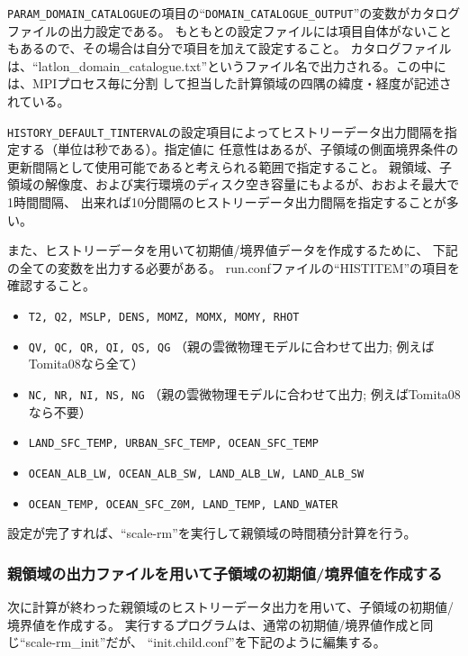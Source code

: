\verb|PARAM_DOMAIN_CATALOGUE|の項目の``\verb|DOMAIN_CATALOGUE_OUTPUT|''の変数がカタログファイルの出力設定である。
もともとの設定ファイルには項目自体がないこともあるので、その場合は自分で項目を加えて設定すること。
カタログファイルは、``latlon\_domain\_catalogue.txt''というファイル名で出力される。この中には、MPIプロセス毎に分割
して担当した計算領域の四隅の緯度・経度が記述されている。

\verb|HISTORY_DEFAULT_TINTERVAL|の設定項目によってヒストリーデータ出力間隔を指定する（単位は秒である）。指定値に
任意性はあるが、子領域の側面境界条件の更新間隔として使用可能であると考えられる範囲で指定すること。
親領域、子領域の解像度、および実行環境のディスク空き容量にもよるが、おおよそ最大で1時間間隔、
出来れば10分間隔のヒストリーデータ出力間隔を指定することが多い。

また、ヒストリーデータを用いて初期値/境界値データを作成するために、
下記の全ての変数を出力する必要がある。
run.confファイルの``HISTITEM''の項目を確認すること。

\begin{itemize}
 \item \verb|T2, Q2, MSLP, DENS, MOMZ, MOMX, MOMY, RHOT|
 \item \verb|QV, QC, QR, QI, QS, QG| {\small （親の雲微物理モデルに合わせて出力; 例えばTomita08なら全て）}
 \item \verb|NC, NR, NI, NS, NG| {\small （親の雲微物理モデルに合わせて出力; 例えばTomita08なら不要）}
 \item \verb|LAND_SFC_TEMP, URBAN_SFC_TEMP, OCEAN_SFC_TEMP|
 \item \verb|OCEAN_ALB_LW, OCEAN_ALB_SW, LAND_ALB_LW, LAND_ALB_SW|
 \item \verb|OCEAN_TEMP, OCEAN_SFC_Z0M, LAND_TEMP, LAND_WATER|
\end{itemize}

設定が完了すれば、``scale-rm''を実行して親領域の時間積分計算を行う。


\subsubsection{親領域の出力ファイルを用いて子領域の初期値/境界値を作成する}
次に計算が終わった親領域のヒストリーデータ出力を用いて、子領域の初期値/境界値を作成する。
実行するプログラムは、通常の初期値/境界値作成と同じ``scale-rm\_init''だが、
``init.child.conf''を下記のように編集する。\\

